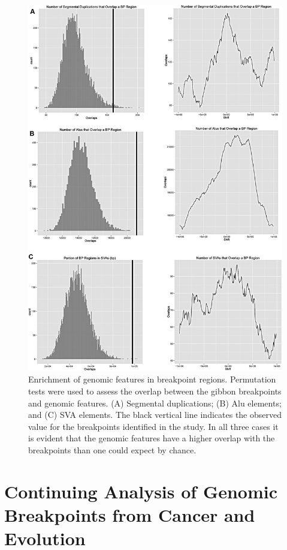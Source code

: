 \begin{figure}
\centering
\includegraphics{figures/gibbon_bac_permutations.jpg}
\caption{Enrichment of genomic features in breakpoint regions. Permutation tests were used to assess the overlap between the gibbon breakpoints and genomic features. (A) Segmental duplications; (B) Alu elements; and (C) SVA elements. The black vertical line indicates the observed value for the breakpoints identified in the study. In all three cases it is evident that the genomic features have a higher overlap with the breakpoints than one could expect by chance.}
\label{gibbon_bac_permutations}

\end{figure}

\section{Continuing Analysis of Genomic Breakpoints from Cancer and Evolution}

